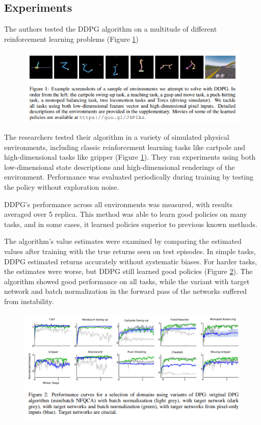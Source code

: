 \documentclass{article}
\begin{document}
\subsection{Experiments}
The authors tested the DDPG algorithm on a multitude of different reinforcement learning problems (Figure \ref{fig:1})
\begin{figure}[H]

	\centering
	\includegraphics[scale = 0.6]{figures/results_1.png}\hfill

	\label{fig:1}

\end{figure}
The researchers tested their algorithm in a variety of simulated physical environments, including classic reinforcement learning tasks like cartpole and high-dimensional tasks like gripper (Figure \ref{fig:1}). They ran experiments using both low-dimensional state descriptions and high-dimensional renderings of the environment. Performance was evaluated periodically during training by testing the policy without exploration noise.

DDPG's performance across all environments was measured, with results averaged over 5 replica. This method was able to learn good policies on many tasks, and in some cases, it learned policies superior to previous known methods.

The algorithm's value estimates were examined by comparing the estimated values after training with the true returns seen on test episodes. In simple tasks, DDPG estimated returns accurately without systematic biases. For harder tasks, the estimates were worse, but DDPG still learned good policies (Figure \ref{fig:2}). The algorithm showed good performance on all tasks, while the variant with target network and batch normalization in the forward pass of the networks suffered from instability.

\begin{figure}[h]

	\centering
	\includegraphics[scale = 0.6]{figures/results_2.png}\hfill

	\label{fig:2}

\end{figure}
\end{document}
